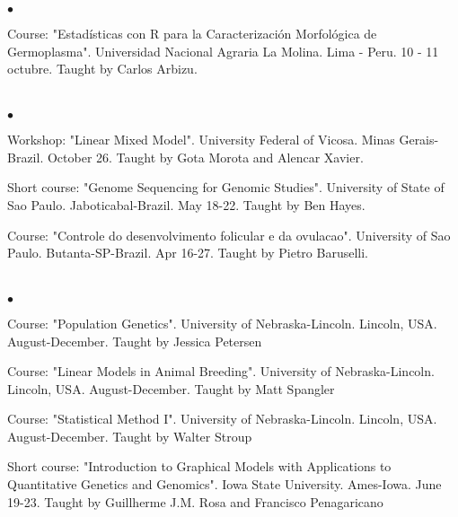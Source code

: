 \documentclass[margin,line,10pt]{res}
\newenvironment{list2}{
  \begin{list}{$\bullet$}{%
      \setlength{\itemsep}{0in}
      \setlength{\parsep}{0in} \setlength{\parskip}{0in}
      \setlength{\topsep}{0in} \setlength{\partopsep}{0in} 
      \setlength{\leftmargin}{0.2in}}}{\end{list}}
\begin{document}
\begin{resume}
\vspace{0.5cm}

\section{}
\begin{list2}

\item Course: "Estadísticas con R para la Caracterización Morfológica de Germoplasma". Universidad Nacional Agraria La Molina. Lima - Peru. 10 - 11 octubre. Taught by Carlos Arbizu.
\end{list2}
\vspace{0.5cm}



\section{}
\begin{list2}
\item Workshop: "Linear Mixed Model". University Federal of Vicosa. Minas Gerais-Brazil. October 26. Taught by Gota Morota and Alencar Xavier.
\vspace{0.5cm}
\item Short course: "Genome Sequencing for Genomic Studies". University of State of Sao Paulo. Jaboticabal-Brazil. May 18-22. Taught by Ben Hayes.
\vspace{0.5cm}
\item Course: "Controle do desenvolvimento folicular e da ovulacao". University of Sao Paulo. Butanta-SP-Brazil. Apr 16-27. Taught by Pietro Baruselli.
\vspace{0.5cm}
\end{list2}

\section{}
\begin{list2}
\item Course: "Population Genetics". University of Nebraska-Lincoln. Lincoln, USA. August-December. Taught by Jessica Petersen
\vspace{0.5cm}
\item Course: "Linear Models in Animal Breeding". University of Nebraska-Lincoln. Lincoln, USA. August-December. Taught by Matt Spangler
\vspace{0.5cm}
\item Course: "Statistical Method I". University of Nebraska-Lincoln. Lincoln, USA. August-December. Taught by Walter Stroup
\vspace{0.5cm}
\item Short course: "Introduction to Graphical Models with Applications to Quantitative Genetics and Genomics". Iowa State University. Ames-Iowa. June 19-23. Taught by Guillherme J.M. Rosa and Francisco Penagaricano
\vspace{0.5cm}
\end{list2}


\end{resume}
\end{document}
